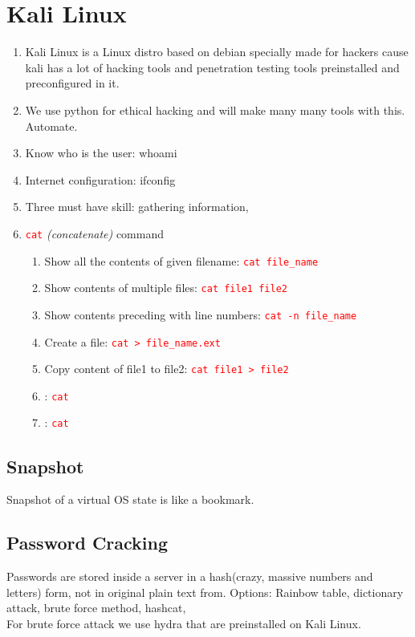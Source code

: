 \documentclass[12 pt, letterpaper]{extarticle}
\newcommand{\R}{\textcolor{red}} %
\newcommand{\T}{\texttt}
\begin{document}
\section*{Kali Linux}
\begin{enumerate}
	\item Kali Linux is a Linux distro based on debian specially made for hackers cause kali has a lot of hacking tools and penetration testing tools preinstalled and preconfigured in it.
	\item We use python for ethical hacking and will make many many tools with this. Automate.
	\item Know who is the user: whoami
	\item Internet configuration: ifconfig
	\item Three must have skill: gathering information,

	\item \R{\T{cat}} \textit{(concatenate)} command
	      \begin{enumerate}
		      \item Show all the contents of given  filename: \R{\T{cat file\_name}}
		      \item Show contents of multiple files: \R{\T{cat file1 file2}}
		      \item Show contents preceding with line numbers: \R{\T{cat -n file\_name}}
		      \item Create a file: \R{\T{cat > file\_name.ext}}
		      \item Copy content of file1 to file2: \R{\T{cat file1 > file2}}
		      \item : \R{\T{cat }}
		      \item : \R{\T{cat }}
	      \end{enumerate}
\end{enumerate}

\subsection{Snapshot}
Snapshot of a virtual OS state is like a bookmark.

\subsection{Password Cracking}
Passwords are stored inside a server in a hash(crazy, massive numbers and letters) form, not in original plain text from.
Options: Rainbow table, dictionary attack, brute force method, hashcat, \\
For brute force attack we use hydra that are preinstalled on Kali Linux.
\end{document}
